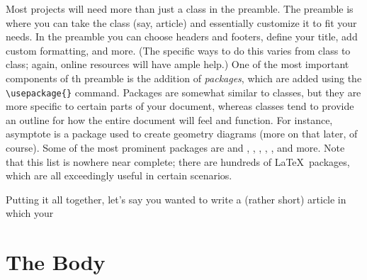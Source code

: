 Most projects will need more than just a class in the preamble. The preamble is where you can take the class (say, article) and essentially customize it to fit your needs. In the preamble you can choose headers and footers, define your title, add custom formatting, and more. (The specific ways to do this varies from class to class; again, online resources will have ample help.) One of the most important components of th preamble is the addition of \emph{packages}, which are added using the \verb|\usepackage{}| command. Packages are somewhat similar to classes, but they are more specific to certain parts of your document, whereas classes tend to provide an outline for how the entire document will feel and function. For instance, asymptote is a package used to create geometry diagrams (more on that later, of course). Some of the most prominent packages are  and , , , , , and more. Note that this list is nowhere near complete; there are hundreds of \LaTeX\ packages, which are all exceedingly useful in certain scenarios. 

Putting it all together, let's say you wanted to write a (rather short) article in which your 

\section{The Body}